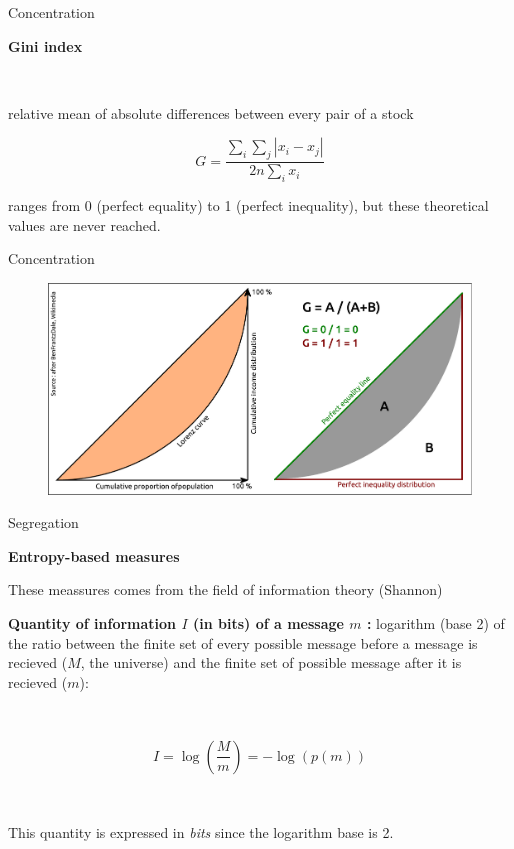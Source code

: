 \begin{frame}{Concentration}

\textbf{Gini index}

~

relative mean of absolute differences between every pair of a stock 

\begin{equation}
\nonumber
G = \frac{\sum_i \sum_j |x_i - x_j|}{2n \sum_i x_i}
\end{equation}


ranges from 0 (perfect equality) to 1 (perfect inequality), but these theoretical values are never reached.





\end{frame}	



\begin{frame}{Concentration}


\begin{figure}
\includegraphics[width=12cm]{Lorenz_EN.pdf}
\end{figure}

\end{frame}


\begin{frame}{Segregation}

\textbf{Entropy-based measures}

These meassures comes from the field of information theory (Shannon) ~

\textbf{Quantity of information $I$ (in bits) of a message $m$ :} logarithm (base 2) of the ratio between the finite set of every possible message before a message is recieved ($M$, the universe) and  the finite set of possible message after it is recieved ($m$):

~

\begin{equation}
\nonumber
  I = \log\left(\frac{M}{m} \right) = - \log(p(m))
\end{equation}

~

This quantity is expressed in \emph{bits} since the logarithm base is 2.

\end{frame}


